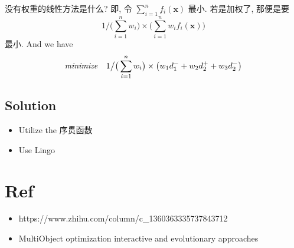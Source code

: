 \documentclass{ctexart}
\begin{document}
没有权重的线性方法是什么? 即, 令 \(\sum _{i = 1} ^{n} f _{i} (\mathbf x)\) 最小. 若是加权了, 那便是要
\[
1 \big/ \big( \sum _{i = 1} ^{n}  w_{i}\big) \times \big( \sum _{i = 1} ^{n} w _{i} f _{i} (\mathbf x) \big)
\]
最小. And we have
\[
  {\it minimize} \quad 1 \big/ \big( \sum _{i = 1} ^{n}  w_{i}\big) \times \big( w _{1} d _{1} ^- + w_2 d_2 ^{+} + w_3 d_2 ^{-}\big)
\]

\subsection{Solution}
\begin{itemize}
\item Utilize the 序贯函数
\item Use Lingo
\end{itemize}
\section{Ref}
\begin{itemize}
\item https://www.zhihu.com/column/c\_1360363335737843712
\item MultiObject optimization interactive and evolutionary approaches
\end{itemize}
\end{document}
